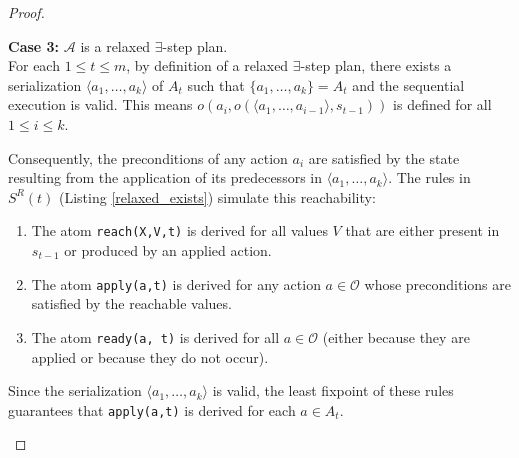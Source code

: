 \documentclass[
     11pt,                    %
     a4paper,             %
     BCOR=10mm,     %
     DIV=14,                 %
     listof=totoc,                    %
     bibliography=totoc,       %
     index=totoc,              %
     parskip            %
     twoside,
     headsepline
     ]{scrreprt}
\theoremstyle{definition}
\theoremstyle{definition}
\theoremstyle{remark}
\theoremstyle{bfnote}
\begin{document}
\begin{proof}
\begin{itemize}
      \textbf{Case 3:} $\mathcal A$ is a relaxed $\exists$-step plan. \\
      For each $1 \le t \le m$, by definition of a relaxed $\exists$-step plan, there exists a serialization $\langle a_1, \dots, a_k \rangle$ of $A_t$ such that $\{a_1, \dots, a_k\} = A_t$ and the sequential execution is valid. This means $o(a_i, o(\langle a_1, \dots, a_{i-1} \rangle, s_{t-1}))$ is defined for all $1 \le i \le k$.
      
      Consequently, the preconditions of any action $a_i$ are satisfied by the state resulting from the application of its predecessors in $\langle a_1, \dots, a_k \rangle$.
      The rules in $S^R(t)$ (Listing \ref{relaxed_exists}) simulate this reachability:
      \begin{enumerate}[label=(\roman*)]
        \item The atom \texttt{reach(X,V,t)} is derived for all values $V$ that are either present in $s_{t-1}$ or produced by an applied action.
        \item The atom \texttt{apply(a,t)} is derived for any action $a \in \mathcal O$ whose preconditions are satisfied by the reachable values.
        \item The atom \texttt{ready(a, t)} is derived for all $a \in \mathcal O$ (either because they are applied or because they do not occur).
      \end{enumerate} 
      Since the serialization $\langle a_1, \dots, a_k \rangle$ is valid, the least fixpoint of these rules guarantees that \texttt{apply(a,t)} is derived for each $a \in A_t$.
      

\end{itemize}
\end{proof}
\end{document}
